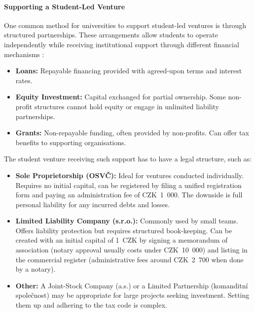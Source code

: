 \paragraph{Supporting a Student-Led Venture}\label{subsec:supporting-student-venture}
One common method for universities to support student-led ventures is through structured partnerships. These arrangements allow students to operate independently while receiving institutional support through different financial mechanisms \cite{fundinvoice-funding}:
\begin{itemize}
    \item \textbf{Loans:} Repayable financing provided with agreed-upon terms and interest rates.
    \item \textbf{Equity Investment:} Capital exchanged for partial ownership. Some non-profit structures cannot hold equity or engage in unlimited liability partnerships.
    \item \textbf{Grants:} Non-repayable funding, often provided by non-profits. Can offer tax benefits to supporting organisations.
\end{itemize}
The student venture receiving such support has to have a legal structure, such as:
\begin{itemize}
    \item \textbf{Sole Proprietorship (OSVČ):} Ideal for ventures conducted individually. Requires no initial capital, can be registered by filing a unified registration form and paying an administration fee of CZK~1~000. The downside is full personal liability for any incurred debts and losses. \cite{fakturoid-osvc, Zapletalova-osvc, lano-payroll, mpsv-social-sec}
    \item \textbf{Limited Liability Company (s.r.o.):} Commonly used by small teams. Offers liability protection but requires structured book-keeping. Can be created with an initial capital of 1~CZK by signing a memorandum of association (notary approval usually costs under CZK~10~000) and listing in the commercial register (administrative fees around CZK~2~700 when done by a notary). \cite{vajda-llc, lano-payroll, mpsv-social-sec}
    \item \textbf{Other:} A Joint-Stock Company (a.s.) or a Limited Partnership (komanditní společnost) may be appropriate for large projects seeking investment. Setting them up and adhering to the tax code is complex.\cite{jake-obchodni-spolecnosti}
\end{itemize}

